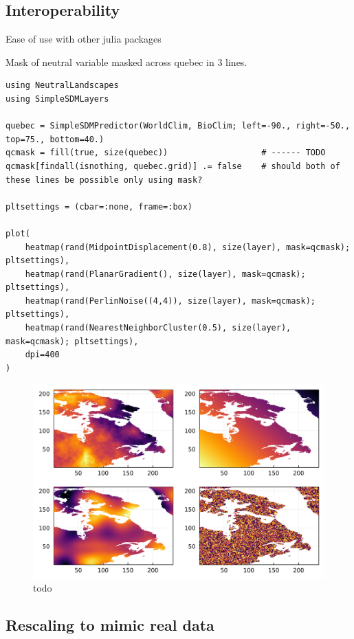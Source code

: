 \documentclass[11pt]{article}
\makeatletter
\def\maxwidth{\ifdim\Gin@nat@width>\linewidth\linewidth
\else\Gin@nat@width\fi}
\let\Oldincludegraphics\includegraphics
\renewcommand{\includegraphics}[1]{\Oldincludegraphics[width=\maxwidth]{#1}}
\makeatother
\begin{document}
\hypertarget{interoperability}{%
\subsection{Interoperability}\label{interoperability}}

Ease of use with other julia packages

Mask of neutral variable masked across quebec in 3 lines.

\begin{verbatim}
using NeutralLandscapes
using SimpleSDMLayers

quebec = SimpleSDMPredictor(WorldClim, BioClim; left=-90., right=-50., top=75., bottom=40.)
qcmask = fill(true, size(quebec))                   # ------ TODO
qcmask[findall(isnothing, quebec.grid)] .= false    # should both of these lines be possible only using mask?

pltsettings = (cbar=:none, frame=:box)

plot(
    heatmap(rand(MidpointDisplacement(0.8), size(layer), mask=qcmask); pltsettings),
    heatmap(rand(PlanarGradient(), size(layer), mask=qcmask); pltsettings),
    heatmap(rand(PerlinNoise((4,4)), size(layer), mask=qcmask); pltsettings),
    heatmap(rand(NearestNeighborCluster(0.5), size(layer), mask=qcmask); pltsettings),
    dpi=400
)
\end{verbatim}

\begin{figure}
\centering
\includegraphics{./figures/interoperable.png}
\caption{todo}
\end{figure}

\hypertarget{rescaling-to-mimic-real-data}{%
\subsection{Rescaling to mimic real
data}\label{rescaling-to-mimic-real-data}}
\end{document}
